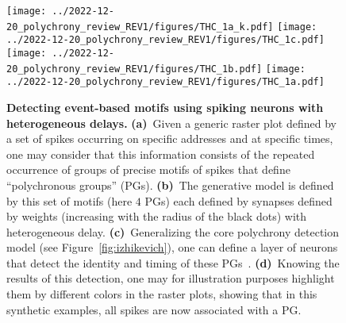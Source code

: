\documentclass[brainsci, %
               review,submit,pdftex,moreauthors
               ]{Definitions/mdpi}
\begin{document}
%
%
\begin{figure}[H]%
  \centering
  \texttt{[image: ../2022-12-20\_polychrony\_review\_REV1/figures/THC\_1a\_k.pdf]}
  \texttt{[image: ../2022-12-20\_polychrony\_review\_REV1/figures/THC\_1c.pdf]}
  \texttt{[image: ../2022-12-20\_polychrony\_review\_REV1/figures/THC\_1b.pdf]}
  \texttt{[image: ../2022-12-20\_polychrony\_review\_REV1/figures/THC\_1a.pdf]}
    \caption{\textbf{Detecting event-based motifs using spiking neurons with heterogeneous delays.} 
    {\bf (a)}~Given a generic raster plot defined by a set of spikes occurring on specific addresses and at specific times, one may consider that this information consists of the repeated occurrence of groups of precise motifs of spikes that define ``polychronous groups'' (PGs). 
    {\bf (b)}~The generative model is defined by this set of motifs (here $4$ PGs) each defined by  synapses defined by weights (increasing with the radius of the black dots) with heterogeneous delay. 
    {\bf (c)}~Generalizing the core polychrony detection model (see Figure~\ref{fig:izhikevich}), one can define a layer of neurons that detect the identity and timing of these PGs~\citep{grimaldi_learning_2022}. %
    {\bf (d)}~Knowing the results of this detection, one may for illustration purposes highlight them by different colors in the raster plots, showing that in this synthetic examples, all spikes are now associated with a PG. 
     }
  \label{fig:THC} %
\end{figure}
% 
\end{document}

